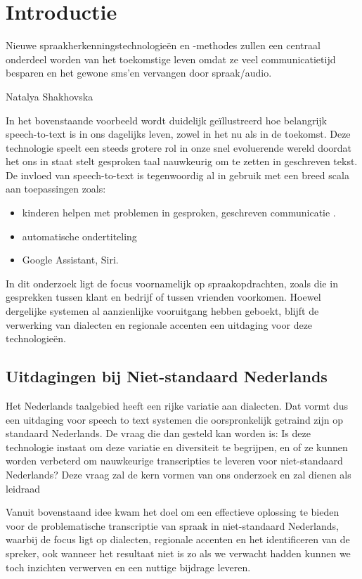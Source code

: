 \section{Introductie}%
\label{sec:introductie}
\epigraph{Nieuwe spraakherkenningstechnologieën en -methodes zullen een centraal onderdeel worden van het toekomstige leven omdat ze veel communicatietijd besparen en het gewone sms'en vervangen door spraak/audio.}{Natalya Shakhovska}

In het bovenstaande voorbeeld wordt duidelijk geïllustreerd hoe belangrijk speech-to-text is in ons dagelijks leven, zowel in het nu als in de toekomst. Deze technologie speelt een steeds grotere rol in onze snel evoluerende wereld doordat het ons in staat stelt gesproken taal nauwkeurig om te zetten in geschreven tekst. De invloed van speech-to-text is tegenwoordig al in gebruik met een breed scala aan toepassingen zoals:
\begin{itemize}
    \item kinderen helpen met problemen in gesproken, geschreven communicatie \cite{Kambouri2023}.
    \item automatische ondertiteling
    \item Google Assistant, Siri.
\end{itemize}

In dit onderzoek ligt de focus voornamelijk op spraakopdrachten, zoals die in gesprekken tussen klant en bedrijf of tussen vrienden voorkomen. Hoewel dergelijke systemen al aanzienlijke vooruitgang hebben geboekt, blijft de verwerking van dialecten en regionale accenten een uitdaging voor deze technologieën.

\subsection{Uitdagingen bij Niet-standaard Nederlands}
Het Nederlands taalgebied heeft een rijke variatie aan dialecten. Dat vormt dus een uitdaging voor speech to text systemen die oorspronkelijk getraind zijn op standaard Nederlands. De vraag die dan gesteld kan worden is: Is deze technologie instaat om deze variatie en diversiteit te begrijpen, en of ze kunnen worden verbeterd om nauwkeurige transcripties te leveren voor niet-standaard Nederlands?
Deze vraag zal de kern vormen van ons onderzoek en zal dienen als leidraad

Vanuit bovenstaand idee kwam het doel om een effectieve oplossing te bieden voor de problematische transcriptie van spraak in niet-standaard Nederlands, waarbij de focus ligt op dialecten, regionale accenten en het identificeren van de spreker, ook wanneer het resultaat niet is zo als we verwacht hadden kunnen we toch inzichten verwerven en een nuttige bijdrage leveren.

